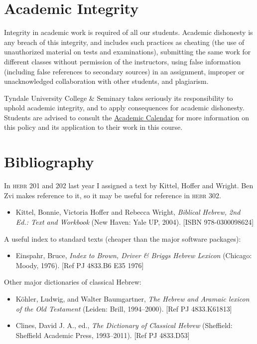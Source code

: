 \documentclass[12pt]{article}
\begin{document}
\section{Academic Integrity}

Integrity in academic work is required of all our students. Academic
dishonesty is any breach of this integrity, and includes such practices
as cheating (the use of unauthorized material on tests and
examinations), submitting the same work for different classes without
permission of the instructors, using false information (including false
references to secondary sources) in an assignment, improper or
unacknowledged collaboration with other students, and plagiarism.

Tyndale University College \& Seminary takes seriously its
responsibility to uphold academic integrity, and to apply consequences
for academic dishonesty. Students are advised to consult the
\href{http://www.tyndale.ca/registrar/calendar}{Academic Calendar} for
more information on this policy and its application to their work in
this course.

\section{Bibliography}

In \textsc{hebr} 201 and 202 last year I assigned a text by Kittel,
Hoffer and Wright. Ben Zvi makes reference to it, so it may be useful
for reference in \textsc{hebr} 302.

\begin{itemize}
\item
  Kittel, Bonnie, Victoria Hoffer and Rebecca Wright, \emph{Biblical
  Hebrew, 2nd Ed.: Text and Workbook} (New Haven: Yale UP, 2004).
  {[}ISBN 978-0300098624{]}
\end{itemize}

A useful index to standard texts (cheaper than the major software
packages):

\begin{itemize}
\item
  Einspahr, Bruce, \emph{Index to Brown, Driver \& Briggs Hebrew
  Lexicon} (Chicago: Moody, 1976). {[}Ref PJ 4833.B6 E35 1976{]}
\end{itemize}

Other major dictionaries of classical Hebrew:

\begin{itemize}
\item
  Köhler, Ludwig, and Walter Baumgartner, \emph{The Hebrew and Aramaic
  lexicon of the Old Testament} (Leiden: Brill, 1994--2000). {[}Ref PJ
  4833.K61813{]}
\item
  Clines, David J. A., ed., \emph{The Dictionary of Classical Hebrew}
  (Sheffield: Sheffield Academic Press, 1993--2011). {[}Ref PJ
  4833.D53{]}
\end{itemize}
\end{document}
